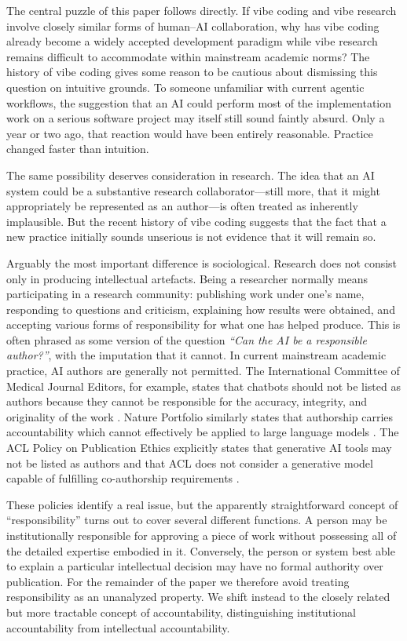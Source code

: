 \documentclass[12pt]{article}
\begin{document}
The central puzzle of this paper follows directly. If vibe coding and vibe research involve closely similar forms of human--AI collaboration, why has vibe coding already become a widely accepted development paradigm while vibe research remains difficult to accommodate within mainstream academic norms?
The history of vibe coding gives some reason to be cautious about dismissing this question on intuitive grounds. To someone unfamiliar with current agentic workflows, the suggestion that an AI could perform most of the implementation work on a serious software project may itself still sound faintly absurd. Only a year or two ago, that reaction would have been entirely reasonable. Practice changed faster than intuition.

The same possibility deserves consideration in research. The idea that an AI system could be a substantive research collaborator---still more, that it might appropriately be represented as an author---is often treated as inherently implausible. But the recent history of vibe coding suggests that the fact that a new practice initially sounds unserious is not evidence that it will remain so.

Arguably the most important difference is sociological. Research does not consist only in producing intellectual artefacts. Being a researcher normally means participating in a research community: publishing work under one's name, responding to questions and criticism, explaining how results were obtained, and accepting various forms of responsibility for what one has helped produce.
This is often phrased as some version of the question \emph{``Can the AI be a responsible author?''}, with the imputation that it cannot. In current mainstream academic practice, AI authors are generally not permitted. The International Committee of Medical Journal Editors, for example, states that chatbots should not be listed as authors because they cannot be responsible for the accuracy, integrity, and originality of the work \citep{icmje2026ai}. Nature Portfolio similarly states that authorship carries accountability which cannot effectively be applied to large language models \citep{nature2026ai}. The ACL Policy on Publication Ethics explicitly states that generative AI tools may not be listed as authors and that ACL does not consider a generative model capable of fulfilling co-authorship requirements \citep{acl2026policy}.

These policies identify a real issue, but the apparently straightforward concept of ``responsibility'' turns out to cover several different functions. A person may be institutionally responsible for approving a piece of work without possessing all of the detailed expertise embodied in it. Conversely, the person or system best able to explain a particular intellectual decision may have no formal authority over publication.
For the remainder of the paper we therefore avoid treating responsibility as an unanalyzed property. We shift instead to the closely related but more tractable concept of accountability, distinguishing institutional accountability from intellectual accountability.
\end{document}
